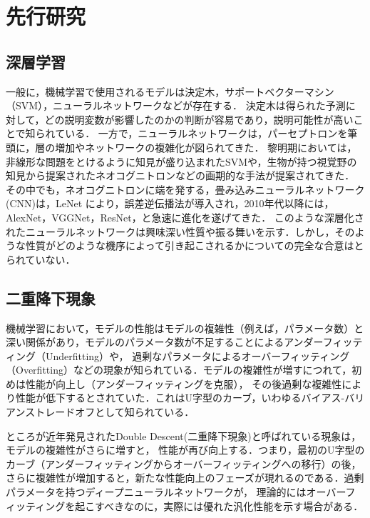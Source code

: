 \chapter{先行研究}
\section{深層学習}
一般に，機械学習で使用されるモデルは決定木，サポートベクターマシン（SVM）\cite{SVM}，ニューラルネットワークなどが存在する．
決定木は得られた予測に対して，どの説明変数が影響したのかの判断が容易であり，説明可能性が高いことで知られている．
一方で，ニューラルネットワークは，パーセプトロンを筆頭に，層の増加やネットワークの複雑化が図られてきた．
黎明期においては，非線形な問題をとけるように知見が盛り込まれたSVMや，生物が持つ視覚野の知見から提案されたネオコグニトロンなどの画期的な手法が提案されてきた．
その中でも，ネオコグニトロンに端を発する，畳み込みニューラルネットワーク(CNN)は，LeNet \cite{LeNet}により，誤差逆伝播法が導入され，2010年代以降には，AlexNet\cite{AlexNet}，VGGNet\cite{VGGNet}，ResNet\cite{ResNet}，と急速に進化を遂げてきた．
このような深層化されたニューラルネットワークは興味深い性質や振る舞いを示す．しかし，そのような性質がどのような機序によって引き起こされるかについての完全な合意はとられていない．

\newpage

\section{二重降下現象}
機械学習において，モデルの性能はモデルの複雑性（例えば，パラメータ数）と深い関係があり，モデルのパラメータ数が不足することによるアンダーフィッティング（Underfitting）や，
過剰なパラメータによるオーバーフィッティング（Overfitting）などの現象が知られている．モデルの複雑性が増すにつれて，初めは性能が向上し（アンダーフィッティングを克服），
その後過剰な複雑性により性能が低下するとされていた．これはU字型のカーブ，いわゆるバイアス-バリアンストレードオフ\cite{Rajnarayan2017-ml,Belkin2018-yx}として知られている．

ところが近年発見されたDouble Descent(二重降下現象)\cite{Belkin_2019}と呼ばれている現象は，モデルの複雑性がさらに増すと，
性能が再び向上する．つまり，最初のU字型のカーブ（アンダーフィッティングからオーバーフィッティングへの移行）の後，
さらに複雑性が増加すると，新たな性能向上のフェーズが現れるのである．過剰パラメータを持つディープニューラルネットワークが，
理論的にはオーバーフィッティングを起こすべきなのに，実際には優れた汎化性能を示す場合がある\cite{ResNet, ViT}．

